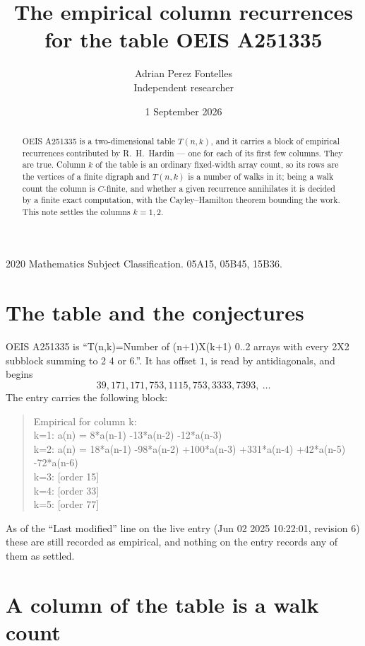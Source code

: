\documentclass[11pt,a4paper]{article}
\title{The empirical column recurrences for the table OEIS A251335}
\author{Adrian Perez Fontelles\\ \small Independent researcher}
\date{1 September 2026}
\theoremstyle{plain}
\theoremstyle{definition}
\begin{document}
\maketitle

\begin{abstract}
OEIS A251335 is a two-dimensional table $T(n,k)$, and it carries a block of empirical
recurrences contributed by R.~H.~Hardin --- one for each of its first few columns. They are
true. Column $k$ of the table is an ordinary fixed-width array count, so its rows are the
vertices of a finite digraph and $T(n,k)$ is a number of walks in it; being a walk count the
column is $C$-finite, and whether a given recurrence annihilates it is decided by a finite
exact computation, with the Cayley--Hamilton theorem bounding the work. This note settles the
columns $k=1, 2$.
\end{abstract}

\noindent\small 2020 Mathematics Subject Classification. 05A15, 05B45, 15B36.\normalsize

\section{The table and the conjectures}

OEIS A251335 is ``T(n,k)=Number of (n+1)X(k+1) 0..2 arrays with every 2X2 subblock summing to 2 4 or 6.''. It has offset $1$, is
read by antidiagonals, and begins
\[
39, 171, 171, 753, 1115, 753, 3333, 7393,\ \dots
\]
The entry carries the following block:
\begin{quote}\small
Empirical for column k:\\
k=1: a(n) = 8*a(n-1) -13*a(n-2) -12*a(n-3)\\
k=2: a(n) = 18*a(n-1) -98*a(n-2) +100*a(n-3) +331*a(n-4) +42*a(n-5) -72*a(n-6)\\
k=3: [order 15]\\
k=4: [order 33]\\
k=5: [order 77]\\
\end{quote}
As of the ``Last modified'' line on the live entry (Jun 02 2025 10:22:01, revision 6) these are still
recorded as empirical, and nothing on the entry records any of them as settled.

\section{A column of the table is a walk count}
\end{document}
